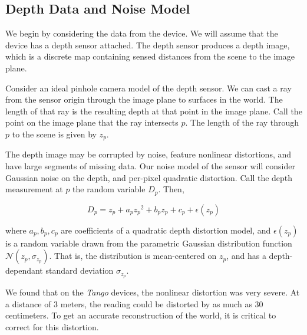 \documentclass[10pt,twocolumn,letterpaper]{article}
\begin{document}
\subsection{Depth Data and Noise Model}
\label{subsection:calibration}
We begin by considering the data from the device. We will assume that the device
has a depth sensor attached. The depth sensor produces a depth image, which is
a discrete map containing sensed distances from the scene to the image plane.

Consider an ideal pinhole camera model of the depth sensor. We can cast a ray
from the sensor origin through the image plane to surfaces in the world. The
length of that ray is the resulting depth at that point in the image plane. Call
the point on the image plane that the ray intersects $p$. The length of the ray
through $p$ to the scene is given by $z_p$. 

The depth image may be corrupted by noise, feature nonlinear distortions, and
have large segments of missing data. Our noise model of the sensor will consider
Gaussian noise on the depth, and per-pixel quadratic distortion. Call the depth
 measurement at $p$ the random variable $D_p$. Then,
 
 \begin{equation}
 	D_p = z_p + a_p{z_p}^2 + b_p z_p + c_p + \epsilon(z_p)
 \end{equation} 
 
 \noindent where $a_p, b_p, c_p$ are coefficients of a quadratic depth
 distortion model, and $\epsilon(z_p)$ is a random variable drawn from the
 parametric Gaussian distribution function $\mathcal{N}(z_p, \sigma_{z_p})$. 
 That is, the distribution is mean-centered on $z_p$, and has a depth-dependant
 standard deviation $\sigma_{z_p}$.
 
 We found that on the \emph{Tango} \cite{Tango} devices, the nonlinear distortion
 was very severe. At a distance of 3 meters, the reading could be distorted by as much as
 30 centimeters. To get an accurate reconstruction of the world, it is critical
 to correct for this distortion.
 
\end{document}
